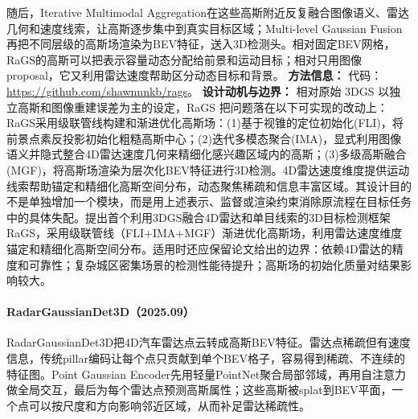 随后，Iterative Multimodal Aggregation在这些高斯附近反复融合图像语义、雷达几何和速度线索，让高斯逐步集中到真实目标区域；Multi-level Gaussian Fusion再把不同层级的高斯场渲染为BEV特征，送入3D检测头。相对固定BEV网格，RaGS的高斯可以把表示容量动态分配给前景和运动目标；相对只用图像proposal，它又利用雷达速度帮助区分动态目标和背景。
\textbf{方法信息：} 代码：\url{https://github.com/shawnnnkb/rags}。
\textbf{设计动机与边界：} 相对原始 3DGS 以独立高斯和图像重建误差为主的设定，RaGS 把问题落在以下可实现的改动上：RaGS采用级联管线构建和渐进优化高斯场：(1)基于视锥的定位初始化(FLI)，将前景点素反投影初始化粗糙高斯中心；(2)迭代多模态聚合(IMA)，显式利用图像语义并隐式整合4D雷达速度几何来精细化感兴趣区域内的高斯；(3)多级高斯融合(MGF)，将高斯场渲染为层次化BEV特征进行3D检测。4D雷达速度维度提供运动线索帮助锚定和精细化高斯空间分布，动态聚焦稀疏和信息丰富区域。其设计目的不是单独增加一个模块，而是用上述表示、监督或渲染约束消除原流程在目标任务中的具体失配。提出首个利用3DGS融合4D雷达和单目线索的3D目标检测框架RaGS，采用级联管线（FLI+IMA+MGF）渐进优化高斯场，利用雷达速度维度锚定和精细化高斯空间分布。适用时还应保留论文给出的边界：依赖4D雷达的精度和可靠性；复杂城区密集场景的检测性能待提升；高斯场的初始化质量对结果影响较大。
\paragraph{RadarGaussianDet3D（2025.09）\cite{2509_16119}}
RadarGaussianDet3D把4D汽车雷达点云转成高斯BEV特征。雷达点稀疏但有速度信息，传统pillar编码让每个点只贡献到单个BEV格子，容易得到稀疏、不连续的特征图。Point Gaussian Encoder先用轻量PointNet聚合局部邻域，再用自注意力做全局交互，最后为每个雷达点预测高斯属性；这些高斯被splat到BEV平面，一个点可以按尺度和方向影响邻近区域，从而补足雷达稀疏性。

